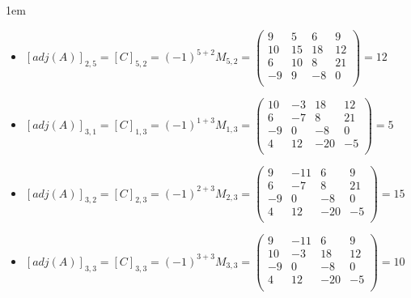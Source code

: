 \documentclass[12pt, fleqn]{article}                             %
\newenvironment{SmallIndentation}[1][0.75em]                    %
        {\begin{adjustwidth}{#1}{}\begin{footnotesize}}             %
        {\end{footnotesize}\end{adjustwidth}}                       %
\theoremstyle{break}                                            %
\newcommand{\pVector}[1]                                        %
        { \ensuremath{\begin{pmatrix}#1\end{pmatrix}} }             %
\begin{document}
\begin{itemize}
\begin{SmallIndentation}[1em]
\begin{itemize}
                    \item
                        $[adj(A)]_{2, 5} 
                            = [C]_{5, 2} 
                            = (-1)^{5+2} M_{5, 2}
                            = \pVector{
                                    9  & 5  & 6   & 9    \\
                                    10 & 15 & 18  & 12   \\
                                    6  & 10 & 8   & 21   \\
                                    -9 & 9  & -8  & 0    \\
                                }
                            = 12$

                    \item
                        $[adj(A)]_{3, 1} 
                            = [C]_{1, 3} 
                            = (-1)^{1+3} M_{1, 3}
                            = \pVector{
                                    10 & -3 & 18  & 12   \\
                                    6  & -7 & 8   & 21   \\
                                    -9 & 0  & -8  & 0    \\
                                    4  & 12 & -20 & -5   \\
                                }
                            = 5$

                    \item
                        $[adj(A)]_{3, 2} 
                            = [C]_{2, 3} 
                            = (-1)^{2+3} M_{2, 3}
                            = \pVector{
                                    9  & -11 & 6   & 9    \\
                                    6  & -7  & 8   & 21   \\
                                    -9 & 0   & -8  & 0    \\
                                    4  & 12  & -20 & -5   \\
                                }
                            = 15$

                    \item
                        $[adj(A)]_{3, 3} 
                            = [C]_{3, 3} 
                            = (-1)^{3+3} M_{3, 3}
                            = \pVector{
                                    9  & -11 & 6   & 9    \\
                                    10 & -3  & 18  & 12   \\
                                    -9 & 0   & -8  & 0    \\
                                    4  & 12  & -20 & -5   \\
                                }
                            = 10$


\end{itemize}
\end{SmallIndentation}
\end{itemize}
\end{document}
